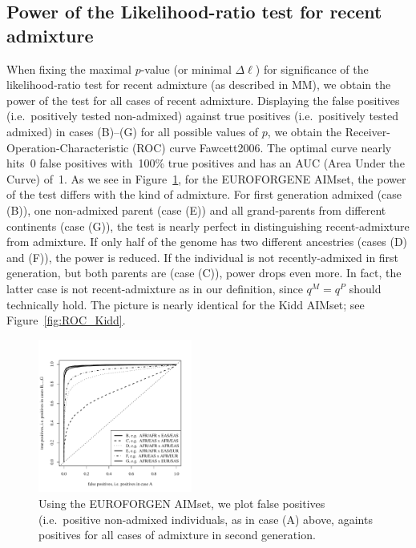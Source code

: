 \documentclass[12pt]{article}
\theoremstyle{definition}
\begin{document}
\subsection{Power of the Likelihood-ratio test for recent admixture}
When fixing the maximal $p$-value (or minimal $\Delta\ell$) for
significance of the likelihood-ratio test for recent admixture (as
described in MM), we obtain the power of the test for all cases of
recent admixture. Displaying the false positives (i.e.\ positively
tested non-admixed) against true positives (i.e.\ positively tested
admixed) in cases (B)--(G) for all possible values of $p$, we obtain
the Receiver-Operation-Characteristic (ROC) curve
\cite{article}{Fawcett2006}. The optimal curve nearly hits~0 false
positives with~100\% true positives and has an AUC (Area Under the
Curve) of~1. As we see in Figure~\ref{fig:ROC_EUROFORGEN}, for the
EUROFORGENE AIMset, the power of the test differs with the kind of
admixture. For first generation admixed (case (B)), one non-admixed
parent (case (E)) and all grand-parents from different continents
(case (G)), the test is nearly perfect in distinguishing
recent-admixture from admixture. If only half of the genome has two
different ancestries (cases (D) and (F)), the power is reduced. If the
individual is not recently-admixed in first generation, but both
parents are (case (C)), power drops even more. In fact, the latter
case is not recent-admixture as in our definition, since $q^M = q^P$
should technically hold. The picture is nearly identical for the Kidd
AIMset; see Figure~\ref{fig:ROC_Kidd}.

\begin{figure}[htb]
  \begin{center}
    \includegraphics[width=0.45\textwidth]{roc-curve-EUROFORGENE.pdf}
  \end{center}
  \caption{Using the EUROFORGEN AIMset, we plot false positives (i.e.\
    positive non-admixed individuals, as in case (A) above, againts
    positives for all cases of admixture in second generation.}
  \label{fig:ROC_EUROFORGEN}
\end{figure}
\end{document}
